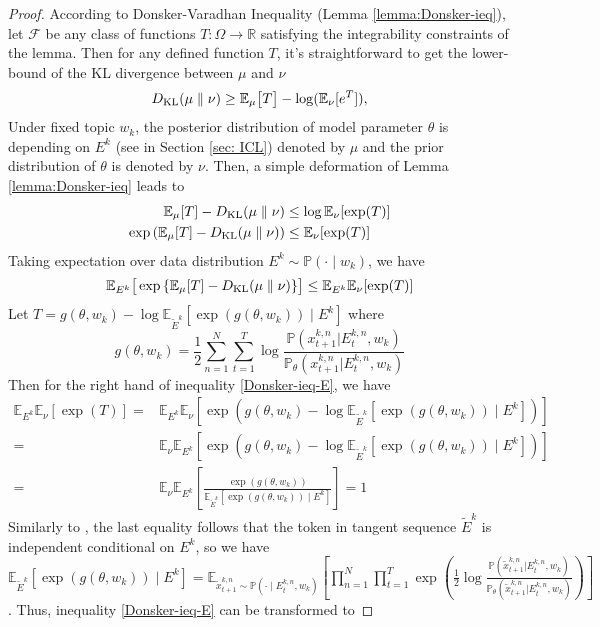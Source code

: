 \begin{proof}
	According to Donsker-Varadhan Inequality (Lemma \ref{lemma:Donsker-ieq}), let $\mathcal{F}$ be any class of functions $T:\Omega \rightarrow \mathbb{R}$ satisfying the integrability constraints of the lemma. Then for any defined function $T$, it's straightforward to get the lower-bound of the KL divergence between $\mu$ and $\nu$
	$$
	D_{\mathrm{KL}}(\mu\parallel \nu) \geq \mathbb{E}_\mu\big[T\big]-\log(\mathbb{E}_\nu[e^T]),
	$$
	Under fixed topic $w_k$, the posterior distribution of model parameter $\theta$ is depending on $E^k$ (see in Section \ref{sec: ICL}) denoted by $\mu$ and the prior distribution of $\theta$ is denoted by $\nu$. Then, a simple deformation of Lemma \ref{lemma:Donsker-ieq} leads to
	$$
	\begin{aligned}
		\mathbb{E}_{\mu}[T]-D_{\mathrm{KL}}(\mu\parallel \nu) &\leq \operatorname{log}\mathbb{E}_{\nu}[\operatorname{exp}(T)] \\
		\operatorname{exp}{\left(\mathbb{E}_{\mu}[T]-D_{\mathrm{KL}}(\mu\parallel \nu)\right)} &\leq \mathbb{E}_{\nu}[\operatorname{exp}(T)]
	\end{aligned}
	$$
	Taking expectation over data distribution $E^{k} \sim \mathbb{P}(\cdot\mid w_k)$, we have
	\begin{equation}
		\label{Donsker-ieq-E}
		\mathbb{E}_{E^{k}}\big[\operatorname{exp}{\{\mathbb{E}_{\mu}[T]-D_{\mathrm{KL}}(\mu\parallel \nu)\}}\big] \leq \mathbb{E}_{E^{k}}\mathbb{E}_{\nu}[\operatorname{exp}(T)]
	\end{equation}
	Let $T=g(\theta,w_k)-\log \mathbb{E}_{\tilde{E}^k}\left[\exp(g(\theta,w_k))\mid E^k\right]$ where 
	$$
	g(\theta,w_k)=\frac{1}{2}\sum_{n=1}^{N} \sum_{t=1}^T \log \frac{\mathbb{P}(x^{k,n}_{t+1}|E^{k,n}_t, w_k)}{\mathbb{P}_\theta(x^{k,n}_{t+1}|E^{k,n}_t, w_k)} 
	$$
	Then for the right hand of inequality \ref{Donsker-ieq-E}, we have
	$$
	\begin{aligned}
		\mathbb{E}_{E^{k}}\mathbb{E}_{\nu}[\operatorname{exp}(T)]
		=&\mathbb{E}_{E^k}\mathbb{E}_{\nu}\left[\exp\left(g(\theta,w_k)-\log \mathbb{E}_{\tilde{E}^k}\left[\exp(g(\theta,w_k))\mid E^k\right]\right)\right]\\
		=&\mathbb{E}_{\nu}\mathbb{E}_{E^k}\left[\exp\left(g(\theta,w_k)-\log \mathbb{E}_{\tilde{E}^k}\left[\exp(g(\theta,w_k))\mid E^k\right]\right)\right]\\
		=&\mathbb{E}_{\nu}\mathbb{E}_{E^k}\left[\frac{\operatorname{exp}\left(g(\theta,w_k)\right)}{\mathbb{E}_{\tilde{E}^k}\left[\exp(g(\theta,w_k))\mid E^k\right]}\right]=1
	\end{aligned}
	$$
	Similarly to \cite{agarwal2020flambe}, the last equality follows that the token in tangent sequence $\tilde{E}^k$ is independent conditional on ${E}^k$, so we have $\mathbb{E}_{\tilde{E}^k}\left[\exp(g(\theta,w_k))\mid E^k\right]=\mathbb{E}_{\tilde{x}^{k,n}_{t+1} \sim \mathbb{P}(\cdot\mid E^{k,n}_t,w_k)}\left[\prod_{n=1}^N \prod_{t=1}^T \exp{\left(\frac{1}{2}\log \frac{\mathbb{P}(\tilde{x}^{k,n}_{t+1}|E^{k,n}_t, w_k)}{\mathbb{P}_\theta(\tilde{x}^{k,n}_{t+1}|E^{k,n}_t, w_k)}\right)} \right]$. Thus, inequality \ref{Donsker-ieq-E} can be transformed to

\end{proof}
